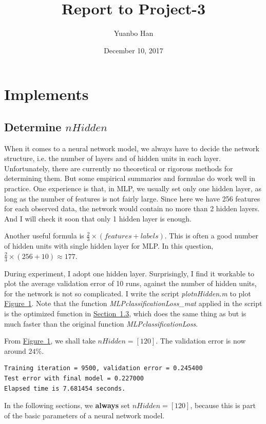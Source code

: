 \documentclass{article}
\title{Report to Project-3}
\author{Yuanbo Han\quad15300180032}
\date{December 10, 2017}
\begin{document}
\maketitle

\tableofcontents

\section{Implements}
\subsection{Determine $nHidden$}
\label{sec-1.1}
When it comes to a neural network model, we always have to decide the network structure, i.e. the number of layers and of hidden units in each layer. Unfortunately, there are currently no theoretical or rigorous methods for determining them. But some empirical summaries and formulae do work well in practice. One experience is that, in MLP, we usually set only one hidden layer, as long as the number of features is not fairly large. Since here we have 256 features for each observed data, the network would contain no more than 2 hidden layers. And I will check it soon that only 1 hidden layer is enough.

Another useful formula is $\frac{2}{3} \times (features + labels)$. This is often a good number of hidden units with single hidden layer for MLP. In this question, $\frac{2}{3} \times (256 + 10) \approx 177$. 

During experiment, I adopt one hidden layer. Surprisingly, I find it workable to plot the average validation error of 10 runs, against the number of hidden units, for the network is not so complicated. I write the script \emph{plotnHidden.m} to plot \hyperref[fig-1]{Figure~1}. Note that the function \emph{MLPclassificationLoss\_mat} applied in the script is the optimized function in \hyperref[sec-1.3]{Section~1.3}, which does the same thing as but is much faster than the original function \emph{MLPclassificationLoss}.

From \hyperref[fig-1]{Figure~1}, we shall take $nHidden = [120]$. The validation error is now around $24\%$. 

\begin{verbatim}
Training iteration = 9500, validation error = 0.245400
Test error with final model = 0.227000
Elapsed time is 7.681454 seconds.
\end{verbatim}

In the following sections, we \textbf{always} set $nHidden = [120]$, because this is part of the basic parameters of a neural network model.
\end{document}
